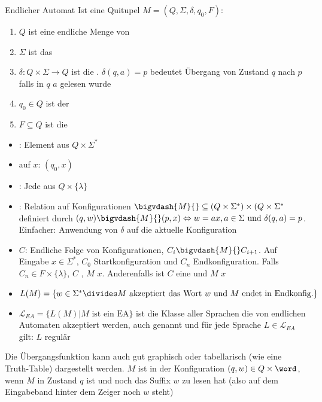 \begin{definition}[]{Endlicher Automat}
    Ist eine Quitupel $M = (Q, \Sigma, \delta, q_0, F)$:
    \begin{enumerate}[label=\textit{(\roman*)}]
        \item $Q$ ist eine endliche Menge von 
        \item $\Sigma$ ist das 
        \item $\delta: Q \times \Sigma \rightarrow Q$ ist die . $\delta(q, a) = p$ bedeutet Übergang von Zustand $q$ nach $p$ falls in $q$ $a$ gelesen wurde
        \item $q_0 \in Q$ ist der 
        \item $F \subseteq Q$ ist die 
    \end{enumerate}
    \rmvspace
    \rmvspace
    \begin{multicols}{2}
        \begin{itemize}
            \item {}: Element aus $Q \times \Sigma^*$
            \item {} auf $x$: $(q_0, x)$
            \item {}: Jede aus $Q \times \{ \lambda \}$
        \end{itemize}
    \end{multicols}
    \rmvspace
    \rmvspace
    \begin{itemize}
        \item {}: Relation auf Konfigurationen $\bigvdash{M}{} \subseteq (Q \times \Sigma^*) \times (Q \times \Sigma^*$ definiert durch $(q, w) \bigvdash{M}{} (p, x) \Leftrightarrow w = ax, a \in \Sigma \text{ und } \delta(q, a) = p$. Einfacher: Anwendung von $\delta$ auf die aktuelle Konfiguration
        \item {} $C$: Endliche Folge von Konfigurationen, $C_i \bigvdash{M}{} C_{i + 1}$.
              Auf Eingabe $x \in \Sigma^*$, $C_0$ Startkonfiguration und $C_n$ Endkonfiguration.
              Falls $C_n \in F \times \{ \lambda \}$, $C$ , $M$  $x$.
              Anderenfalls ist $C$ eine  und $M$  $x$
        \item {} $L(M) = \{ w \in \Sigma^* \divides \text{$M$ akzeptiert das Wort } w \text{ und $M$ endet in Endkonfig.} \}$
        \item $\mathcal{L}_{EA} = \{ L(M) | M \text{ ist ein EA}\}$ ist die Klasse aller Sprachen die von endlichen Automaten akzeptiert werden, auch genannt  und für jede Sprache $L \in \mathcal{L}_{EA}$ gilt: $L$ regulär
    \end{itemize}
\end{definition}
Die Übergangsfunktion kann auch gut graphisch oder tabellarisch (wie eine Truth-Table) dargestellt werden.
$M$ ist in der Konfiguration $(q, w) \in Q \times \word$, wenn $M$ in Zustand $q$ ist und noch das Suffix $w$ zu lesen hat (also auf dem Eingabeband hinter dem Zeiger noch $w$ steht)

